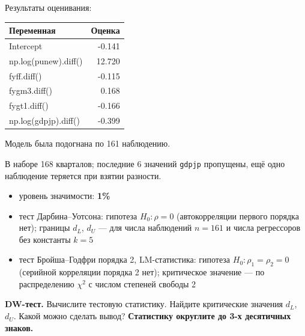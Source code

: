 \documentclass[
  russian,
]{article}
\newcounter{none} %
\providecommand{\tightlist}{%
  \setlength{\itemsep}{0pt}\setlength{\parskip}{0pt}}
\begin{document}
Результаты оценивания:

{\def\LTcaptype{none} %
\begin{longtable}[]{@{}lr@{}}
\toprule\noalign{}
Переменная & Оценка \\
\midrule\noalign{}
\endhead
\bottomrule\noalign{}
\endlastfoot
Intercept & -0.141 \\
np.log(punew).diff() & 12.720 \\
fyff.diff() & -0.115 \\
fygm3.diff() & 0.168 \\
fygt1.diff() & -0.166 \\
np.log(gdpjp).diff() & -0.399 \\
\end{longtable}
}

Модель была подогнана по 161 наблюдению.

В наборе 168 кварталов; последние 6 значений \texttt{gdpjp} пропущены,
ещё одно наблюдение теряется при взятии разности.

\begin{tcolorbox}[enhanced jigsaw, arc=.35mm, bottomrule=.15mm, bottomtitle=1mm, breakable, colback=white, colbacktitle=quarto-callout-important-color!10!white, colframe=quarto-callout-important-color-frame, coltitle=black, left=2mm, leftrule=.75mm, opacityback=0, opacitybacktitle=0.6, rightrule=.15mm, title=\textcolor{quarto-callout-important-color}{\faExclamation}\hspace{0.5em}{Условия теста}, titlerule=0mm, toprule=.15mm, toptitle=1mm]

\begin{itemize}
\tightlist
\item
  уровень значимости: \textbf{1\%}
\item
  тест Дарбина--Уотсона: гипотеза \(H_0:\rho=0\) (автокорреляции первого
  порядка нет); границы \(d_L\), \(d_U\) --- для числа наблюдений
  \(n=161\) и числа регрессоров без константы \(k=5\)
\item
  тест Бройша--Годфри порядка 2, LM-статистика: гипотеза
  \(H_0:\rho_1=\rho_2=0\) (серийной корреляции порядка 2 нет);
  критическое значение --- по распределению \(\chi^2\) с числом степеней
  свободы 2
\end{itemize}

\end{tcolorbox}

\textbf{DW-тест.} Вычислите тестовую статистику. Найдите критические
значения \(d_L\), \(d_U\). Какой можно сделать вывод? \textbf{Статистику
округлите до 3-х десятичных знаков.}
\end{document}
